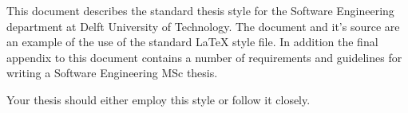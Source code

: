 This document describes the standard thesis style for the Software
Engineering department at Delft University of Technology. The document
and it's source are an example of the use of the standard \LaTeX{} style
file. In addition the final appendix to this document contains a
number of requirements and guidelines for writing a Software
Engineering MSc thesis.

Your thesis should either employ this style or follow it closely.


